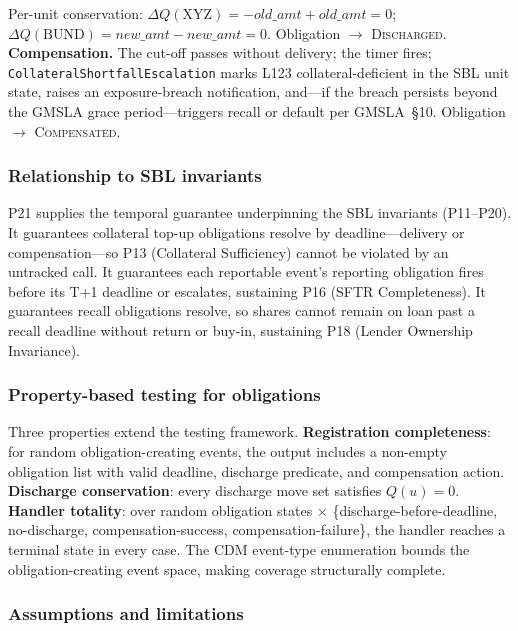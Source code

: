 \documentclass[11pt,a4paper]{article}
\begin{document}
\noindent Per-unit conservation: $\Delta Q(\text{XYZ}) = -\mathit{old\_amt} + \mathit{old\_amt} = 0$; $\Delta Q(\text{BUND}) = \mathit{new\_amt} - \mathit{new\_amt} = 0$. Obligation $\to$ \textsc{Discharged}. \textbf{Compensation.} The cut-off passes without delivery; the timer fires; \texttt{CollateralShortfallEscalation} marks L123 collateral-deficient in the SBL unit state, raises an exposure-breach notification, and---if the breach persists beyond the GMSLA grace period---triggers recall or default per GMSLA~\S10. Obligation $\to$ \textsc{Compensated}.

\subsubsection{Relationship to SBL invariants}
\label{sec:obligation-sbl-relationship}

P21 supplies the temporal guarantee underpinning the SBL invariants (P11--P20). It guarantees collateral top-up obligations resolve by deadline---delivery or compensation---so P13 (Collateral Sufficiency) cannot be violated by an untracked call. It guarantees each reportable event's reporting obligation fires before its T+1 deadline or escalates, sustaining P16 (SFTR Completeness). It guarantees recall obligations resolve, so shares cannot remain on loan past a recall deadline without return or buy-in, sustaining P18 (Lender Ownership Invariance).

\subsubsection{Property-based testing for obligations}
\label{sec:obligation-testing}

Three properties extend the testing framework. \textbf{Registration completeness}: for random obligation-creating events, the output includes a non-empty obligation list with valid deadline, discharge predicate, and compensation action. \textbf{Discharge conservation}: every discharge move set satisfies $Q(u) = 0$. \textbf{Handler totality}: over random obligation states $\times$ \{discharge-before-deadline, no-discharge, compensation-success, compensation-failure\}, the handler reaches a terminal state in every case. The CDM event-type enumeration bounds the obligation-creating event space, making coverage structurally complete.

\subsubsection{Assumptions and limitations}
\label{sec:obligation-limitations}
\end{document}

